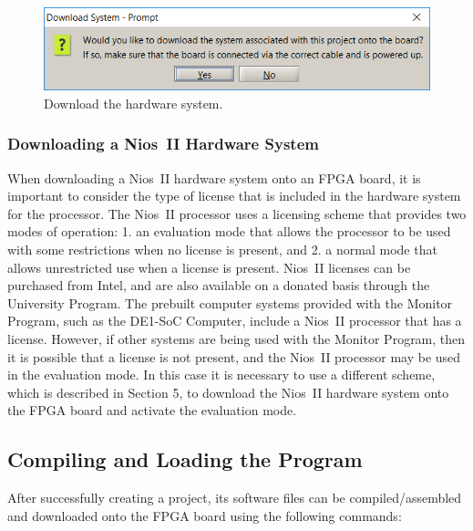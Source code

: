 \documentclass[11pt, twoside, pdftex]{article}
\begin{document}
\begin{enumerate}
\begin{figure}[H]
   \begin{center}
      \includegraphics[scale=1]{screenshots/figure11.png}
   \end{center}
   \caption{Download the hardware system.} 
	 \label{fig:11}
\end{figure}

\subsubsection{Downloading a Nios~II Hardware System}

When downloading a Nios~II hardware system onto an FPGA board, 
it is important to consider the type of license that is included
in the hardware system for the processor.
The Nios~II processor uses a licensing scheme that provides two
modes of operation: 1. an evaluation mode that allows the
processor to be used with some restrictions when no
license is present, and 2. a normal mode that allows unrestricted
use when a license is present. Nios~II licenses can be purchased
from Intel, and are also available on a donated basis through
the University Program.  The prebuilt computer systems provided
with the Monitor Program, such as the DE1-SoC Computer, include a
Nios~II processor that has a license. However, if other systems
are being used with the Monitor Program, then it is
possible that a license is not present, and the Nios~II processor
may be used in the evaluation mode. In this case it is necessary
to use a different scheme, which is described in Section 5,
to download the Nios~II hardware system onto the FPGA board and activate the evaluation mode.

\end{enumerate}
\subsection{Compiling and Loading the Program}

After successfully creating a project, its software files can be compiled/assembled and downloaded onto the FPGA board using the
following commands:
\end{document}
